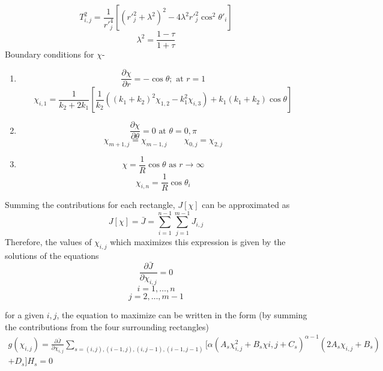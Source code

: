 \documentclass[a4paper]{article}
\begin{document}
	$$	
	T_{i,j}^2 = \frac{1}{r'^4_j}
	\left[
		(r'^2_j+\lambda^2)^2 - 4\lambda^2r'^2_j \cos^2 \theta '_i
	\right]	
	$$
	$$
	\lambda^2 = \frac{1-\tau}{1+\tau}
	$$
	Boundary conditions for $\chi$-
	\begin{enumerate}
	
	\item
	$$
	\frac{\partial \chi}{\partial r} = - \cos \theta; \text{ at } r=1
	$$
	\begin{equation}
	\chi_{i,1}=\frac{1}{k_2+2k_1}
	\left[
		\frac{1}{k_2}
		((k_1+k_2)^2\chi_{1,2} - k_1^2 \chi_{i,3})
		+ k_1(k_1+k_2)\cos \theta
	\right]
	\end{equation}
	
	\item $$ \frac{\partial \chi}{\partial \theta} = 0 \text{ at } \theta = 0, \pi $$
	\begin{equation}
	\chi_{m+1,j} = \chi_{m-1,j} \qquad 
	\chi_{0,j} = \chi_{2,j}
	\end{equation}
	
	\item $$ \chi = \frac{1}{R} \cos \theta \text{ as } r \rightarrow \infty $$
	\begin{equation}
	\chi_{i,n} = \frac{1}{R} \cos \theta_i
	\end{equation}
	
	\end{enumerate}
	
	Summing the contributions for each rectangle, $J[\chi]$ can be approximated as 
	\begin{equation}
	J[\chi] = \bar{J} = 
	\sum\limits_{i=1}^{n-1} \sum\limits_{j=1}^{m-1} J_{i,j}
	\end{equation}
	Therefore, the values of $\chi_{i,j}$ which maximizes this expression is given by the solutions of the equations
	\begin{equation}
	\frac{\partial \bar{J}}{\partial \chi_{i,j}} = 0
	\end{equation}
	$$ i = 1,\ldots,n $$
	$$ j = 2,\ldots,m-1 $$
	
	for a given $i,j$, the equation to maximize can be written in the form (by summing the contributions from the four surrounding rectangles)
	\begin{equation}
	\begin{split}
	g(\chi_{i,j}) = \frac{\partial \bar{J}}{\partial \chi_{i,j}} 
	\sum\limits_{s=(i,j),(i-1,j),(i,j-1),(i-1,j-1)}
	\Biggl[
		\alpha
		\left(
			A_s\chi^2_{i,j} + B_s\chi{i,j} + C_s
		\right)^{\alpha-1}
		\left(
			2A_s\chi_{i,j} + B_s
		\right) \\
		 + D_s
	\Biggr]H_s	
	= 0
	\end{split}
	\end{equation}
	
\end{document}
